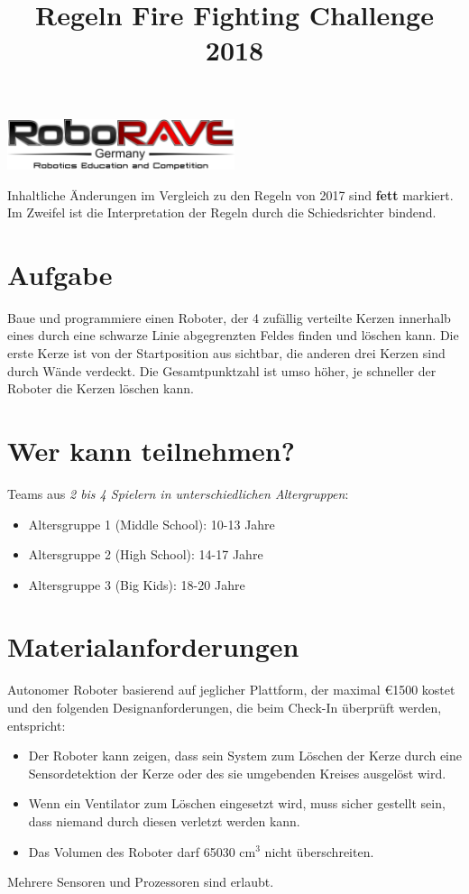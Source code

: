 \documentclass[a4paper,12pt]{article}
\begin{document}
\title{Regeln Fire Fighting Challenge 2018}
\makeatletter
\let\inserttitle\@title
\makeatother

 \begin{center}
\includegraphics[width=0.5\textwidth]{logo.png}

\huge                      %
\bfseries                   %
\inserttitle
  \end{center}
  Inhaltliche Änderungen im Vergleich zu den Regeln von 2017 sind \textbf{fett} markiert. Im Zweifel ist die Interpretation der Regeln durch die Schiedsrichter bindend.
\section{Aufgabe}
Baue und programmiere einen Roboter, der 4 zufällig verteilte Kerzen innerhalb eines durch eine schwarze
Linie abgegrenzten Feldes finden und löschen kann. Die erste Kerze ist von der Startposition aus sichtbar, die
anderen drei Kerzen sind durch Wände verdeckt. Die Gesamtpunktzahl ist umso höher, je schneller der
Roboter die Kerzen löschen kann.
\section{Wer kann teilnehmen?}
Teams aus \emph{2 bis 4 Spielern in unterschiedlichen Altergruppen}:
\begin{itemize}
	\item Altersgruppe 1 (Middle School): 10-13 Jahre
	\item Altersgruppe 2 (High School): 14-17 Jahre
	\item Altersgruppe 3 (Big Kids): 18-20 Jahre
\end{itemize}
\section{Materialanforderungen}
Autonomer Roboter basierend auf jeglicher Plattform, der maximal \euro{1500} kostet und den folgenden
Designanforderungen, die beim Check-In überprüft werden, entspricht:
\begin{itemize}
\item Der Roboter kann zeigen, dass sein System zum Löschen der Kerze durch eine Sensordetektion der Kerze
oder des sie umgebenden Kreises ausgelöst wird.
\item Wenn ein Ventilator zum Löschen eingesetzt wird, muss sicher gestellt sein, dass niemand durch diesen
verletzt werden kann.
\item Das Volumen des Roboter darf 65030 cm$^{3}$ nicht überschreiten.
\end{itemize}
Mehrere Sensoren und Prozessoren sind erlaubt.
\end{document}
